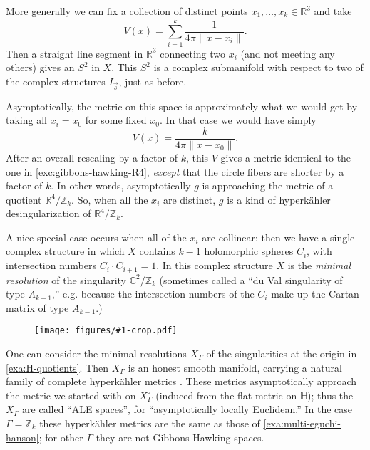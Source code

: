 \documentclass[12pt,letterpaper,reqno]{amsart}
\numberwithin{equation}{section}
\newcommand{\R}{\ensuremath{\mathbb R}}
\newcommand{\C}{\ensuremath{\mathbb C}}
\newcommand{\Z}{\ensuremath{\mathbb Z}}
\newcommand{\bbH}{\ensuremath{\mathbb H}}
\newcommand{\hk}{hyperk\"ahler\xspace}
\newcommand{\norm}[1]{\lVert#1\rVert}
\newcommand{\ti}[1]{\textit{#1}}
\newcommand{\insfig}[2]{\begin{figure}[htbp] \centering \texttt{[image: figures/\#1-crop.pdf]} \label{fig:#1} \end{figure}}
\newcommand{\fixme}[1]{{\color{blue}{[#1]}}}
\begin{document}
\begin{example} \cite{MR520463} \label{exa:multi-eguchi-hanson} More generally we can fix a collection
of distinct points $x_1, \dots, x_k \in \R^3$ and take
\begin{equation}
  V(x) = \sum_{i=1}^k \frac{1}{4 \pi \norm{x - x_i}}.
\end{equation}
Then a straight line segment in $\R^3$ connecting two $x_i$ (and not meeting any others)
gives an $S^2$ in $X$. This $S^2$ is a complex submanifold with respect to two of the complex structures $I_{\vec s}$, just as before.

Asymptotically, the metric on this space is approximately
what we would get by taking all $x_i = x_0$ for some fixed $x_0$. 
In that case we would have simply 
\begin{equation}
 V(x) = \frac{k}{4 \pi \norm{x - x_0}}.
\end{equation}
After an overall rescaling by a factor of $k$, this $V$ 
gives a metric identical to the one in 
\autoref{exc:gibbons-hawking-R4}, \ti{except}
that the circle fibers are shorter by a factor of $k$.
In other words, asymptotically $g$ is approaching the metric of 
a quotient $\R^4 / \Z_k$. So, when all the $x_i$ are distinct,
$g$ is a kind of \hk desingularization of $\R^4 / \Z_k$.

A nice special case occurs when all of the $x_i$ are collinear:
then we have a single complex structure in which $X$ contains $k-1$
holomorphic spheres $C_i$, with intersection numbers
$C_i \cdot C_{i+1} = 1$. In this complex structure $X$ is 
the \ti{minimal resolution} of the singularity $\C^2 / \Z_k$
(sometimes called a ``du Val singularity of type $A_{k-1}$,'' e.g.
because the intersection numbers of the $C_i$ make up the
Cartan matrix of type $A_{k-1}$.)
\end{example}

\insfig{higgs-bundles-5}{0.9}

\begin{example}
One can consider the minimal resolutions $X_\Gamma$
of the singularities at the origin in \autoref{exa:H-quotients}.
Then $X_\Gamma$ is an honest smooth manifold, 
carrying a natural family 
of complete \hk metrics \cite{MR90d:53055}.
These metrics asymptotically approach
the metric we started with on $X_\Gamma^\circ$
(induced from the flat metric on $\bbH$);
thus the $X_\Gamma$ are called ``ALE spaces'',
for ``asymptotically locally Euclidean.''
In the case $\Gamma = \Z_k$ these \hk metrics are
the same as those of \autoref{exa:multi-eguchi-hanson};
for other $\Gamma$ they are not Gibbons-Hawking spaces.
\fixme{How close are they?}
\end{example}
\end{document}
